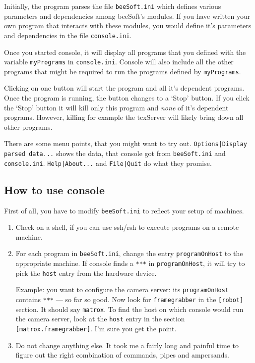 \documentclass{article}
\begin{document}
Initially, the program parses the file \texttt{beeSoft.ini} which defines
various parameters and dependencies among beeSoft's modules. If you have
written your own program that interacts with these modules, you would define
it's parameters and dependencies in the file \texttt{console.ini}.

Once you started console, it will display all programs that you defined with
the variable \texttt{myPrograms} in \texttt{console.ini}. Console will also
include all the other programs that might be required to run the programs
defined by \texttt{myPrograms}.

Clicking on one button will start the program and all it's dependent programs.
Once the program is running, the button changes to a `Stop' button. If you
click the `Stop' button it will kill only this program and \emph{none} of it's
dependent programs. However, killing for example the tcxServer will likely
bring down all other programs.

There are some menu points, that you might want to try out.
\texttt{Options|Display parsed data...} shows the data, that console got from
\texttt{beeSoft.ini} and \texttt{console.ini}. \texttt{Help|About...} and
\texttt{File|Quit} do what they promise.

\subsection{How to use console}

First of all, you have to modify \texttt{beeSoft.ini} to reflect your setup of
machines.

\begin{enumerate}
\item Check on a shell, if you can use ssh/rsh to execute programs on a remote
  machine.
\item For each program in \texttt{beeSoft.ini}, change the entry
  \texttt{programOnHost} to the appropriate machine. If console finds a
  \texttt{***} in \texttt{programOnHost}, it will try to pick the \texttt{host}
  entry from the hardware device.
  
  Example: you want to configure the camera server: its \texttt{programOnHost}
  contains \texttt{***} --- so far so good.  Now look for
  \texttt{framegrabber} in the \texttt{[robot]} section.  It should say
  \texttt{matrox}. To find the host on which console would run the camera
  server, look at the \texttt{host} entry in the section
  \texttt{[matrox.framegrabber]}. I'm sure you get the point.

\item Do not change anything else. It took me a fairly long and painful time
  to figure out the right combination of commands, pipes and ampersands.
\end{enumerate}
\end{document}
